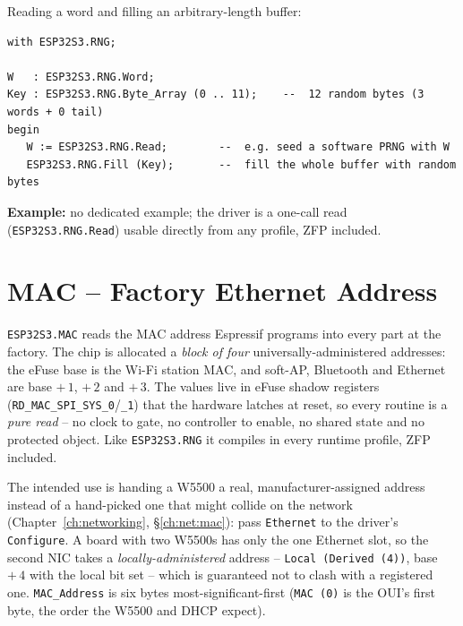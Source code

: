 Reading a word and filling an arbitrary-length buffer:

\begin{lstlisting}
with ESP32S3.RNG;

W   : ESP32S3.RNG.Word;
Key : ESP32S3.RNG.Byte_Array (0 .. 11);    --  12 random bytes (3 words + 0 tail)
begin
   W := ESP32S3.RNG.Read;        --  e.g. seed a software PRNG with W
   ESP32S3.RNG.Fill (Key);       --  fill the whole buffer with random bytes
\end{lstlisting}

\noindent\textbf{Example:} no dedicated example; the driver is a one-call read
(\texttt{ESP32S3.RNG.Read}) usable directly from any profile, ZFP included.

\section{MAC -- Factory Ethernet Address}
\label{app:int:mac}

\texttt{ESP32S3.MAC} reads the MAC address Espressif programs into every part at
the factory. The chip is allocated a \emph{block of four} universally-administered
addresses: the eFuse base is the Wi-Fi station MAC, and soft-AP, Bluetooth and
Ethernet are base $+\,1$, $+\,2$ and $+\,3$. The values live in eFuse shadow
registers (\texttt{RD\_MAC\_SPI\_SYS\_0}/\texttt{\_1}) that the hardware latches at
reset, so every routine is a \emph{pure read} -- no clock to gate, no controller to
enable, no shared state and no protected object. Like \texttt{ESP32S3.RNG} it
compiles in every runtime profile, ZFP included.

The intended use is handing a W5500 a real, manufacturer-assigned address instead
of a hand-picked one that might collide on the network (Chapter~\ref{ch:networking},
\S\ref{ch:net:mac}): pass \texttt{Ethernet} to the driver's \texttt{Configure}. A
board with two W5500s has only the one Ethernet slot, so the second NIC takes a
\emph{locally-administered} address -- \texttt{Local (Derived (4))}, base $+\,4$
with the local bit set -- which is guaranteed not to clash with a registered one.
\texttt{MAC\_Address} is six bytes most-significant-first (\texttt{MAC (0)} is the
OUI's first byte, the order the W5500 and DHCP expect).

